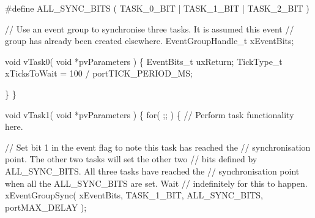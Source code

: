 \begin{DoxyPre}#define ALL\_SYNC\_BITS ( TASK\_0\_BIT | TASK\_1\_BIT | TASK\_2\_BIT )\end{DoxyPre}



\begin{DoxyPre}// Use an event group to synchronise three tasks.  It is assumed this event
// group has already been created elsewhere.
EventGroupHandle\_t xEventBits;\end{DoxyPre}



\begin{DoxyPre}void vTask0( void *pvParameters )
\{
EventBits\_t uxReturn;
TickType\_t xTicksToWait = 100 / portTICK\_PERIOD\_MS;
\begin{DoxyVerb}for( ;; )
{
// Perform task functionality here.

// Set bit 0 in the event flag to note this task has reached the
// sync point.  The other two tasks will set the other two bits defined
// by ALL_SYNC_BITS.  All three tasks have reached the synchronisation
// point when all the ALL_SYNC_BITS are set.  Wait a maximum of 100ms
// for this to happen.
uxReturn = xEventGroupSync( xEventBits, TASK_0_BIT, ALL_SYNC_BITS, xTicksToWait );

if( ( uxReturn & ALL_SYNC_BITS ) == ALL_SYNC_BITS )
{
    // All three tasks reached the synchronisation point before the call
    // to xEventGroupSync() timed out.
}
\end{DoxyVerb}

   \}
\}\end{DoxyPre}



\begin{DoxyPre}void vTask1( void *pvParameters )
\{
    for( ;; )
    \{
    // Perform task functionality here.\end{DoxyPre}



\begin{DoxyPre}    // Set bit 1 in the event flag to note this task has reached the
    // synchronisation point.  The other two tasks will set the other two
    // bits defined by ALL\_SYNC\_BITS.  All three tasks have reached the
    // synchronisation point when all the ALL\_SYNC\_BITS are set.  Wait
    // indefinitely for this to happen.
    xEventGroupSync( xEventBits, TASK\_1\_BIT, ALL\_SYNC\_BITS, portMAX\_DELAY );\end{DoxyPre}



